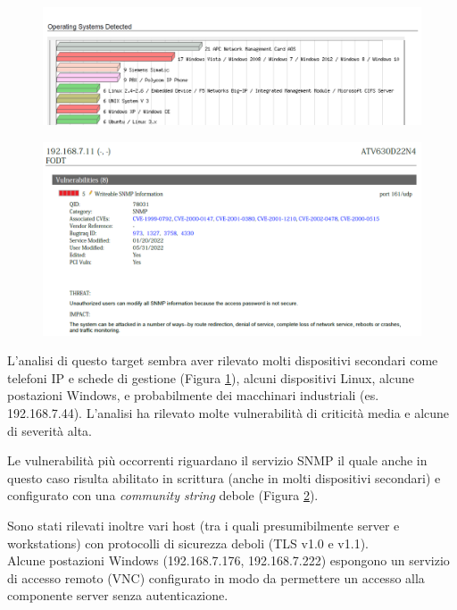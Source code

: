 \documentclass[target=bach,aauheader=]{thud}
\begin{document}
\begin{figure}[t]
    \centering
    \includegraphics[width=1\linewidth]{images/FODT-INT-06_2.png}
    \caption{}
    \label{fig:fodt-int-06_2}
\end{figure}

\begin{figure}[t]
    \centering
    \includegraphics[width=1\linewidth]{images/FODT-INT-06_3.png}
    \caption{}
    \label{fig:fodt-int-06_3}
\end{figure}


L’analisi di questo target sembra aver rilevato molti dispositivi secondari come telefoni IP e schede di gestione (Figura \ref{fig:fodt-int-06_2}), alcuni dispositivi Linux, alcune postazioni Windows, e probabilmente dei macchinari industriali (es. 192.168.7.44).
L’analisi ha rilevato molte vulnerabilità di criticità media e alcune di severità alta.

Le vulnerabilità più occorrenti riguardano il servizio SNMP il quale anche in questo caso risulta abilitato in scrittura (anche in molti dispositivi secondari) e configurato con una \textit{community string} debole (Figura \ref{fig:fodt-int-06_3}).

Sono stati rilevati inoltre vari host (tra i quali presumibilmente server e workstations) con protocolli di sicurezza deboli (TLS v1.0 e v1.1).
\\ Alcune postazioni Windows (192.168.7.176, 192.168.7.222) espongono un servizio di accesso remoto (VNC) configurato in modo da permettere un accesso alla componente server senza autenticazione.
\end{document}
